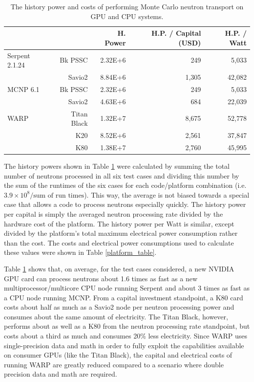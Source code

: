 \documentclass[preprint,12pt]{elsarticle}
\begin{document}
\begin{table}[h]
\centering
\caption{The history power and costs of performing Monte Carlo neutron transport on GPU and CPU systems.}
\label{history_power}
\small
\begin{tabular}{| l r | r | r | r |}
\cline{3-5}
\multicolumn{2}{c|}{}             & H. Power   & H.P. / Capital (USD)   & H.P. / Watt  \\
\hline                            
Serpent 2.1.24   &   Bk PSSC      & 2.32E+6    &   249           &  5,033        \\
                 &   Savio2       & 8.84E+6    & 1,305           & 42,082        \\
\hline                                 
MCNP 6.1         &   Bk PSSC      & 2.32E+6    &   249           &  5,033        \\
                 &   Savio2       & 4.63E+6    &   684           & 22,039        \\
\hline                            
WARP             &   Titan Black  & 1.32E+7    & 8,675           & 52,778        \\
                 &   K20          & 8.52E+6    & 2,561           & 37,847        \\
                 &   K80          & 1.38E+7    & 2,760           & 45,995        \\
\hline
\end{tabular}
\end{table}

The history powers shown in Table \ref{history_power} were calculated by summing the total number of neutrons processed in all six test cases and dividing this number by the sum of the runtimes of the six cases for each code/platform combination (i.e.\ $3.9\times10^8 / \textrm{sum of run times}$).  This way, the average is not biased towards a special case that allows a code to process neutrons especially quickly.  The history power per capital is simply the averaged neutron processing rate divided by the hardware cost of the platform.  The history power per Watt is similar, except divided by the platform's total maximum electrical power consumption rather than the cost.  The costs and electrical power consumptions used to calculate these values were shown in Table \ref{platform_table}.


Table \ref{history_power} shows that, on average, for the test cases considered, a new NVIDIA GPU card can process neutrons about 1.6 times as fast as a new multiprocessor/multicore CPU node running Serpent and about 3 times as fast as a CPU node running MCNP.  From a capital investment standpoint, a K80 card costs about half as much as a Savio2 node per neutron processing power and consumes about the same amount of electricity.  The Titan Black, however, performs about as well as a K80 from the neutron processing rate standpoint, but costs about a third as much and consumes 20\% less electricity.  Since WARP uses single-precision data and math in order to fully exploit the capabilities available on consumer GPUs (like the Titan Black), the capital and electrical costs of running WARP are greatly reduced compared to a scenario where double precision data and math are required. 
\end{document}
